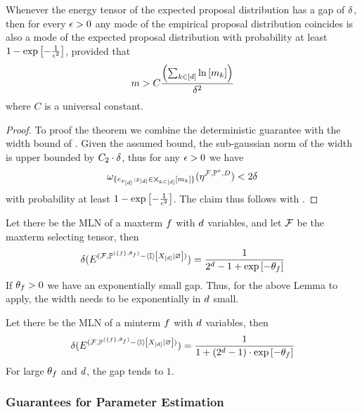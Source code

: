 \begin{theorem}
    \label{the:probGuaranteeProposalDist}
    Whenever the energy tensor of the expected proposal distribution has a gap of $\delta$, then for every $\epsilon>0$ any mode of the empirical proposal distribution coincides is also a mode of the expected proposal distribution with probability at least $1-\mathrm{exp}\left[-\frac{1}{\epsilon^2}\right]$, provided that
    \[ m > C\frac{\left(\sum_{k\in[d]}\ln \left[ m_{k} \right]\right)}{\delta^2} \]
    where $C$ is a universal constant.
\end{theorem}
\begin{proof}
    To proof the theorem we combine the deterministic guarantee  with the width bound of .
    Given the assumed bound, the sub-gaussian norm of the width is upper bounded by $C_2\cdot \delta$, thus for any $\epsilon>0$ we have
    \[  \omega_{\{e_{x_{[d]}} :x_{[d]}\in\bigtimes_{k\in[d]}[m_{k}]\}}(\eta^{\mathcal{F},\mathbb{P}^*,D})  < 2 \delta \]
    with probability at least $1-\mathrm{exp}\left[-\frac{1}{\epsilon^2}\right]$.
    The claim thus follows with .
\end{proof}


\begin{example}
    Let there be the MLN of a maxterm $f$ with $d$ variables, and let $\mathcal{F}$ be the maxterm selecting tensor, then
    \[ \delta(
    E^{(\mathcal{F}, \mathbb{P}^{(\{f\},\theta_{f})} - \left\langle \mathbb{I}\right\rangle \left[ X_{[d]} | \varnothing \right] )}
    ) = \frac{1}{2^{d}-1 + \mathrm{exp}\left[-\theta_{f}\right]}  \]
    If $\theta_{f}>0$ we have an exponentially small gap.
    Thus, for the above Lemma to apply, the width needs to be exponentially in $d$ small.


    Let there be the MLN of a minterm $f$ with $d$ variables, then
    \[ \delta(
    E^{(\mathcal{F}, \mathbb{P}^{(\{f\},\theta_{f})} - \left\langle \mathbb{I}\right\rangle \left[ X_{[d]} | \varnothing \right] )}
    ) = \frac{1}{1+(2^{d}-1)\cdot\mathrm{exp}\left[-\theta_{f}\right]}  \]
    For large $\theta_{f}$ and $d$, the gap tends to $1$.
\end{example}

\subsubsection{Guarantees for Parameter Estimation}

